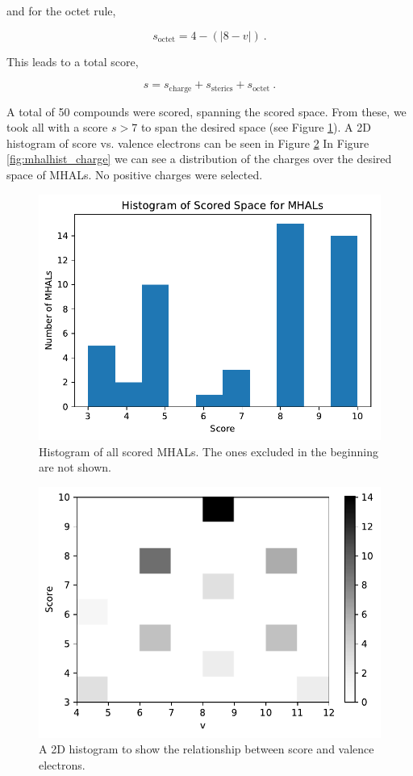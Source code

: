 and for the octet rule,

\begin{equation}
	s_{\textrm{octet}} = 
	4 - (|8-v|) ~.
\end{equation}

This leads to a total score,

\begin{equation}
	s = s_{\textrm{charge}} + s_{\textrm{sterics}} + s_{\textrm{octet}} ~.
\end{equation}

A total of 50 compounds were scored, spanning the scored space. From these, we took all with a score $s > 7$ to span the desired space (see Figure \ref{fig:mhalhist}). A 2D histogram of score vs. valence electrons can be seen in Figure \ref{fig:mhal2dhist} In Figure \ref{fig:mhalhist_charge} we can see a distribution of the charges over the desired space of MHALs. No positive charges were selected. 

\begin{figure}[]{}
\centering
\includegraphics[width=.7\linewidth]{img/mhal_ss_hist.pdf} 
\caption{Histogram of all scored MHALs. The ones excluded in the beginning are not shown.}
\label{fig:mhalhist}
\end{figure}

\begin{figure}[]{}
\centering
\includegraphics[width=.7\linewidth]{img/mhal_ss_score_vs_v_2d_hist.pdf} 
\caption{A 2D histogram to show the relationship between score and valence electrons.}
\label{fig:mhal2dhist}
\end{figure}

